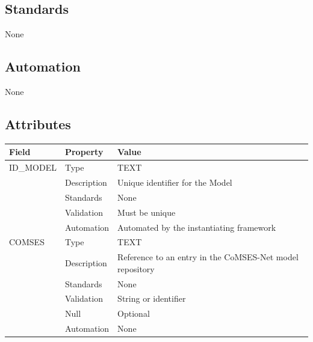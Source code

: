 \subsection{Standards}\label{standards-20}

None

\subsection{Automation}\label{automation-20}

None

\subsection{Attributes}\label{attributes-17}

\begin{longtable}[]{@{}
  >{\raggedright\arraybackslash}p{}
  >{\raggedright\arraybackslash}p{}
  >{\raggedright\arraybackslash}p{}@{}}
\toprule\noalign{}
\begin{minipage}[b]{\linewidth}\raggedright
Field
\end{minipage} & \begin{minipage}[b]{\linewidth}\raggedright
Property
\end{minipage} & \begin{minipage}[b]{\linewidth}\raggedright
Value
\end{minipage} \\
\midrule\noalign{}
\endhead
\bottomrule\noalign{}
\endlastfoot
ID\_MODEL & Type & TEXT \\
& Description & Unique identifier for the Model \\
& Standards & None \\
& Validation & Must be unique \\
& Automation & Automated by the instantiating framework \\
COMSES & Type & TEXT \\
& Description & Reference to an entry in the CoMSES-Net model
repository \\
& Standards & None \\
& Validation & String or identifier \\
& Null & Optional \\
& Automation & None \\
\end{longtable}

